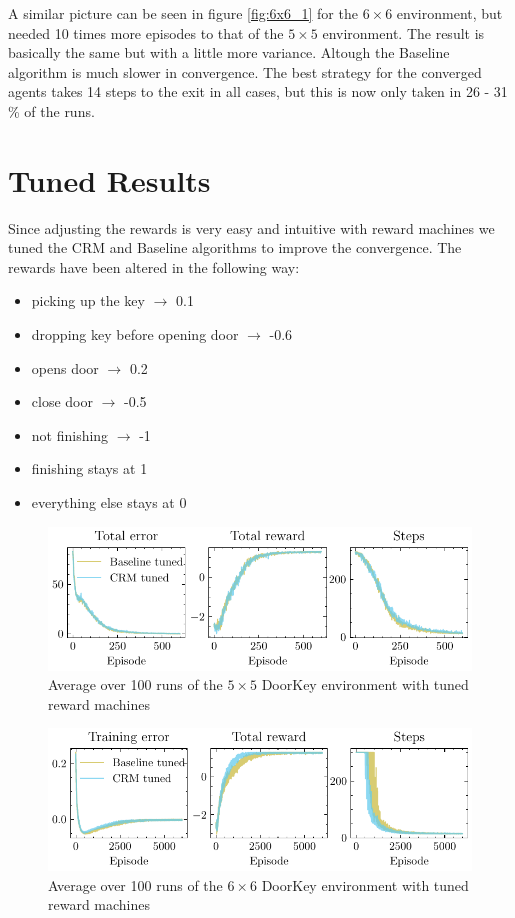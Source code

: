 \documentclass[12pt, a4paper]{article}
\begin{document}
A similar picture can be seen in figure \ref{fig:6x6_1} for the $6 \times 6$ environment, but needed 10 times more episodes to that of the $5 \times 5$ environment. The result is basically the same but with a little more variance. Altough the Baseline algorithm is much slower in convergence. The best strategy for the converged agents takes 14 steps to the exit in all cases, but this is now only taken in 26 - 31 \% of the runs.

\section*{Tuned Results}

Since adjusting the rewards is very easy and intuitive with reward machines we tuned the CRM and Baseline algorithms to improve the convergence. The rewards have been altered in the following way:
\begin{itemize}
	\item picking up the key $\to$ 0.1
	\item dropping key before opening door $\to$ -0.6
	\item opens door $\to$ 0.2
	\item close door $\to$ -0.5
	\item not finishing $\to$ -1
	\item finishing stays at 1
	\item everything else stays at 0
\end{itemize}

\begin{figure}[ht!]
	\centering
	\includegraphics[width=\textwidth]{figures/cmp2_5x5.pdf}
	\caption{Average over 100 runs of the $5 \times 5$ DoorKey environment with tuned reward machines}
	\label{fig:5x5_2}
\end{figure}

\begin{figure}[ht!]
	\centering
	\includegraphics[width=\textwidth]{figures/cmp2_6x6.pdf}
	\caption{Average over 100 runs of the $6 \times 6$ DoorKey environment with tuned reward machines}
	\label{fig:6x6_2}
\end{figure}
\end{document}
